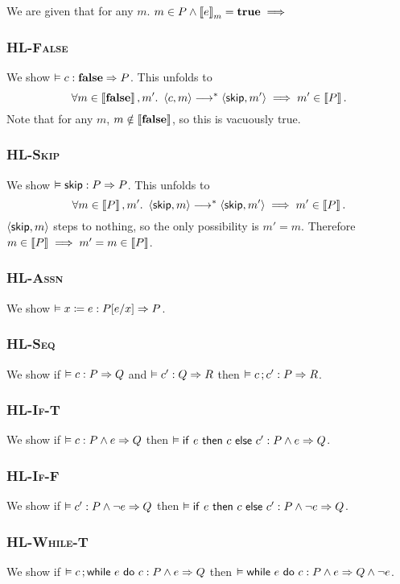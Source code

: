 \documentclass[10pt]{article}
\theoremstyle{definition}
\begin{document}
We are given that for any $m$. $m \in P \wedge \Eval(e,m) = \True \implies $

\subsubsection*{\textsc{HL-False}}
We show $\VAL \Triple c : \EFalse => P$.
This unfolds to
\[
    \forall m \in \Interp{\EFalse}, m'.\
    \Cfg(c, m) \sstepstotrans \Cfg(\Skip, m') 
    \implies m' \in \Interp{P}.
\]
Note that for any $m$, $m \notin \left\llbracket \textbf{false} \right\rrbracket$,
so this is vacuously true.

\subsubsection*{\textsc{HL-Skip}}
We show $\VAL \Triple \Skip : P => P$.
This unfolds to 
$$\forall m \in \Interp{P}, m'.\
\Cfg(\Skip,m) \sstepstotrans \Cfg(\Skip,m') \implies
m' \in \Interp{P}.$$
$\Cfg(\Skip,m)$ steps to nothing,
so the only possibility is $m' = m$.
Therefore $m \in \left\llbracket P \right\rrbracket \implies m' = m \in \left\llbracket P \right\rrbracket$.

\subsubsection*{\textsc{HL-Assn}}
We show $\VAL \Triple \Assn x = e : \Subst P[e/x] => P$.

\subsubsection*{\textsc{HL-Seq}}
We show if $\VAL \Triple c : P => Q$ and $\VAL \Triple c' : Q => R$
then $\VAL \Triple \Seq c;c' : P => R$.
    
\subsubsection*{\textsc{HL-If-T}}
We show if $\VAL \Triple c : P \wedge e => Q$ then
    $\VAL \Triple \ITE e then c else c' : P \wedge e => Q$.

\subsubsection*{\textsc{HL-If-F}}
We show if $\VAL \Triple c' : P \wedge \neg e => Q$ then
    $\VAL \Triple \ITE e then c else c' : P \wedge \neg e => Q$.

\subsubsection*{\textsc{HL-While-T}}
We show if $\VAL \Triple \Seq c; \While e do c : P \wedge e => Q$ then
    $\VAL \Triple \While e do c : P \wedge e => Q \wedge \neg e$. 
\todo{todo}
\end{document}
